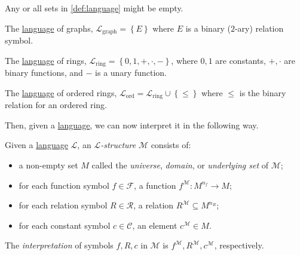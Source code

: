 \begin{remark}
	Any or all sets in \autoref{def:language} might be empty.
\end{remark}

\begin{eg}[Graph]\label{eg:language-graph}
	The \hyperref[def:language]{language} of graphs, \(\mathcal{L} _{\text{graph} } = \left\{ E \right\}\) where \(E\) is a binary (\(2\)-ary) relation symbol.
\end{eg}

\begin{eg}[Ring]\label{eg:language-ring}
	The \hyperref[def:language]{language} of rings, \(\mathcal{L} _{\text{ring} } = \left\{ 0, 1, +, \cdot, - \right\} \), where \(0, 1\) are constants, \(+, \cdot\) are binary functions, and \(-\) is a unary function.
\end{eg}

\begin{eg}\label{eg:language-ordered-ring}
	The \hyperref[def:language]{language} of ordered rings, \(\mathcal{L} _{\text{ord} } = \mathcal{L} _{\text{ring} } \cup \left\{ \leq \right\} \) where \(\leq \) is the binary relation for an ordered ring.
\end{eg}

Then, given a \hyperref[def:language]{language}, we can now interpret it in the following way.

\begin{definition}[Structure]\label{def:structure}
	Given a \hyperref[def:language]{language} \(\mathcal{L} \), an \emph{\(\mathcal{L} \)-structure} \(\mathcal{M} \) consists of:
	\begin{itemize}
		\item a non-empty set \(M\) called the \emph{universe}, \emph{domain}, or \emph{underlying set} of \(\mathcal{M} \);
		\item for each function symbol \(f\in \mathcal{F} \), a function \(f^{\mathcal{M} } \colon M^{n_f} \to M\);
		\item for each relation symbol \(R\in \mathcal{R} \), a relation \(R^{\mathcal{M} } \subseteq M^{n_R}\);
		\item for each constant symbol \(c\in \mathcal{C} \), an element \(c^{\mathcal{M} }\in M\).
	\end{itemize}
\end{definition}

\begin{notation}[Interpretation]
	The \emph{interpretation} of symbols \(f, R, c\) in \(\mathcal{M} \) is \(f^{\mathcal{M} }, R^{\mathcal{M} }, c^{\mathcal{M} }\), respectively.
\end{notation}


